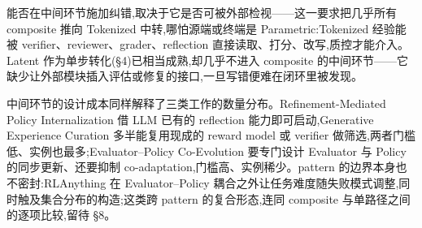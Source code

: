 能否在中间环节施加纠错,取决于它是否可被外部检视——这一要求把几乎所有 composite 推向 Tokenized 中转,哪怕源端或终端是 Parametric:Tokenized 经验能被 verifier、reviewer、grader、reflection 直接读取、打分、改写,质控才能介入。Latent 作为单步转化(§4)已相当成熟,却几乎不进入 composite 的中间环节——它缺少让外部模块插入评估或修复的接口,一旦写错便难在闭环里被发现。

中间环节的设计成本同样解释了三类工作的数量分布。Refinement-Mediated Policy Internalization 借 LLM 已有的 reflection 能力即可启动,Generative Experience Curation 多半能复用现成的 reward model 或 verifier 做筛选,两者门槛低、实例也最多;Evaluator–Policy Co-Evolution 要专门设计 Evaluator 与 Policy 的同步更新、还要抑制 co-adaptation,门槛高、实例稀少。pattern 的边界本身也不密封:RLAnything 在 Evaluator–Policy 耦合之外让任务难度随失败模式调整,同时触及集合分布的构造;这类跨 pattern 的复合形态,连同 composite 与单路径之间的逐项比较,留待 §8。
